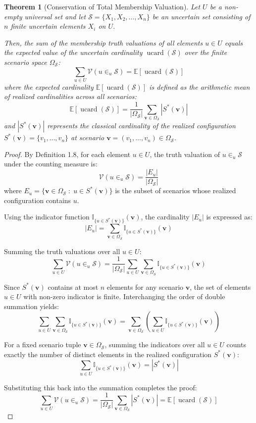 \documentclass[a4paper,12pt, twoside]{memoir}
\newtheorem{theorem}{Theorem}[chapter]
\DeclareMathOperator{\UCARD}{ucard}
\newcommand{\tbd}[1]{\mathcal{#1}} %
\begin{document}
	\begin{theorem}[Conservation of Total Membership Valuation]
		Let $U$ be a non-empty universal set and let $\tbd{S} = \{X_1, X_2, \dots, X_n\}$ be an uncertain set consisting of $n$ finite uncertain elements $X_i$ on $U$.
		
		Then, the sum of the membership truth valuations of all elements $u \in U$ equals the expected value of the uncertain cardinality $\UCARD(\tbd{S})$ over the finite scenario space $\Omega_{\tbd{S}}$:
		\[
		\sum_{u \in U} \mathcal{V}(u \in_u \tbd{S}) = \mathbb{E}\left[\UCARD(\tbd{S})\right]
		\]
		where the expected cardinality $\mathbb{E}\left[\UCARD(\tbd{S})\right]$ is defined as the arithmetic mean of realized cardinalities across all scenarios:
		\[
		\mathbb{E}\left[\UCARD(\tbd{S})\right] = \frac{1}{|\Omega_{\tbd{S}}|} \sum_{\mathbf{v} \in \Omega_{\tbd{S}}} |S^*(\mathbf{v})|
		\]
		and $|S^*(\mathbf{v})|$ represents the classical cardinality of the realized configuration $S^*(\mathbf{v}) = \{v_1, \dots, v_n\}$ at scenario $\mathbf{v} = (v_1, \dots, v_n) \in \Omega_{\tbd{S}}$.
	\end{theorem}
	
	\begin{proof}
		By Definition 1.8, for each element $u \in U$, the truth valuation of $u \in_u \tbd{S}$ under the counting measure is:
		\[
		\mathcal{V}(u \in_u \tbd{S}) = \frac{|E_u|}{|\Omega_{\tbd{S}}|}
		\]
		where $E_u = \{\mathbf{v} \in \Omega_{\tbd{S}} \;:\; u \in S^*(\mathbf{v})\}$ is the subset of scenarios whose realized configuration contains $u$.
		
		Using the indicator function $\mathbb{I}_{\{u \in S^*(\mathbf{v})\}}(\mathbf{v})$, the cardinality $|E_u|$ is expressed as:
		\[
		|E_u| = \sum_{\mathbf{v} \in \Omega_{\tbd{S}}} \mathbb{I}_{\{u \in S^*(\mathbf{v})\}}(\mathbf{v})
		\]
		
		Summing the truth valuations over all $u \in U$:
		\[
		\sum_{u \in U} \mathcal{V}(u \in_u \tbd{S}) = \frac{1}{|\Omega_{\tbd{S}}|} \sum_{u \in U} \sum_{\mathbf{v} \in \Omega_{\tbd{S}}} \mathbb{I}_{\{u \in S^*(\mathbf{v})\}}(\mathbf{v})
		\]
		
		Since $S^*(\mathbf{v})$ contains at most $n$ elements for any scenario $\mathbf{v}$, the set of elements $u \in U$ with non-zero indicator is finite. Interchanging the order of double summation yields:
		\[
		\sum_{u \in U} \sum_{\mathbf{v} \in \Omega_{\tbd{S}}} \mathbb{I}_{\{u \in S^*(\mathbf{v})\}}(\mathbf{v}) = \sum_{\mathbf{v} \in \Omega_{\tbd{S}}} \left( \sum_{u \in U} \mathbb{I}_{\{u \in S^*(\mathbf{v})\}}(\mathbf{v}) \right)
		\]
		
		For a fixed scenario tuple $\mathbf{v} \in \Omega_{\tbd{S}}$, summing the indicators over all $u \in U$ counts exactly the number of distinct elements in the realized configuration $S^*(\mathbf{v})$:
		\[
		\sum_{u \in U} \mathbb{I}_{\{u \in S^*(\mathbf{v})\}}(\mathbf{v}) = |S^*(\mathbf{v})|
		\]
		
		Substituting this back into the summation completes the proof:
		\[
		\sum_{u \in U} \mathcal{V}(u \in_u \tbd{S}) = \frac{1}{|\Omega_{\tbd{S}}|} \sum_{\mathbf{v} \in \Omega_{\tbd{S}}} |S^*(\mathbf{v})| = \mathbb{E}\left[\UCARD(\tbd{S})\right]
		\]
	\end{proof}
	
\end{document}
